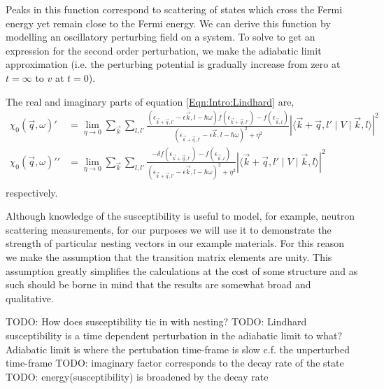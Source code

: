 Peaks in this function correspond to scattering of states which cross the Fermi energy yet remain close to the Fermi energy.  We can derive this function by modelling an oscillatory perturbing field on a system. To solve to get an expression for the second order perturbation, we make the adiabatic limit approximation (i.e. the perturbing potential is gradually increase from zero at $t=\infty$ to $v$ at $t=0$).

The real and imaginary parts of equation \ref{Eqn:Intro:Lindhard} are,
\begin{align}
\chi_0(\vec{q}, \omega)\prime &= \lim_{\eta \to 0} \sum_{\vec{k}}\sum_{l, l\prime}\frac{(\epsilon_{\vec{k}+\vec{q},l\prime} - \epsilon{\vec{k},l} - \hbar\omega) f(\epsilon_{\vec{k}+\vec{q},l\prime}) - f(\epsilon_{\vec{k},l})}{(\epsilon_{\vec{k}+\vec{q},l\prime} - \epsilon{\vec{k},l} - \hbar\omega)^2 + \eta^2}|\langle \vec{k}+\vec{q},l\prime \mid  V \mid \vec{k},l \rangle|^2 \\
\chi_0(\vec{q}, \omega)\prime\prime &= \lim_{\eta \to 0} \sum_{\vec{k}}\sum_{l, l\prime}\frac{-\delta f(\epsilon_{\vec{k}+\vec{q},l\prime}) - f(\epsilon_{\vec{k},l})}{(\epsilon_{\vec{k}+\vec{q},l\prime} - \epsilon{\vec{k},l} - \hbar\omega)^2 + \eta^2}|\langle \vec{k}+\vec{q},l\prime \mid  V \mid \vec{k},l \rangle|^2 \\
\end{align}
respectively.

Although knowledge of the susceptibility is useful to model, for example, neutron scattering measurements, for our purposes we will use it to demonstrate the strength of particular nesting vectors in our example materials. For this reason we make the assumption that the transition matrix elements are unity. This assumption greatly simplifies the calculations at the cost of some structure and as such should be borne in mind that the results are somewhat broad and qualitative.


TODO: How does susceptibility tie in with nesting?
TODO: Lindhard susceptibility is a time dependent perturbation in the adiabatic limit to what? Adiabatic limit is where the pertubation time-frame is slow c.f. the unperturbed time-frame 
TODO: imaginary factor corresponds to the decay rate of the state
TODO: energy(susceptibility) is broadened by the decay rate




